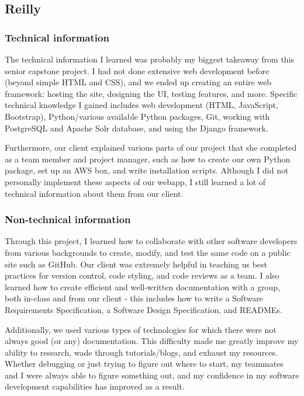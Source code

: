 \documentclass[onecolumn, draftclsnofoot,10pt, compsoc]{IEEEtran}
\begin{document}
\begin{flushleft}
\subsection{Reilly}
\subsubsection{Technical information}
The technical information I learned was probably my biggest takeaway from this senior capstone project. I had not done extensive web development before (beyond simple HTML and CSS), and we ended up creating an entire web framework: hosting the site, designing the UI, testing features, and more. Specific technical knowledge I gained includes web development (HTML, JavaScript, Bootstrap), Python/various available Python packages, Git, working with PostgreSQL  and Apache Solr database, and using the Django framework.
 
Furthermore, our client explained various parts of our project that she completed as a team member and project manager, such as how to create our own Python package, set up an AWS box, and write installation scripts. Although I did not personally implement these aspects of our webapp, I still learned a lot of technical information about them from our client.
 
\subsubsection{Non-technical information}
Through this project, I learned how to collaborate with other software developers from various backgrounds to create, modify, and test the same code on a public site such as GitHub. Our client was extremely helpful in teaching us best practices for version control, code styling, and code reviews as a team. I also learned how to create efficient and well-written documentation with a group, both in-class and from our client - this includes how to write a Software Requirements Specification, a Software Design Specification, and READMEs.
 
Additionally, we used various types of technologies for which there were not always good (or any) documentation. This difficulty made me greatly improve my ability to research, wade through tutorials/blogs, and exhaust my resources. Whether debugging or just trying to figure out where to start, my teammates and I were always able to figure something out, and my confidence in my software development capabilities has improved as a result.
 

\end{flushleft}
\end{document}

